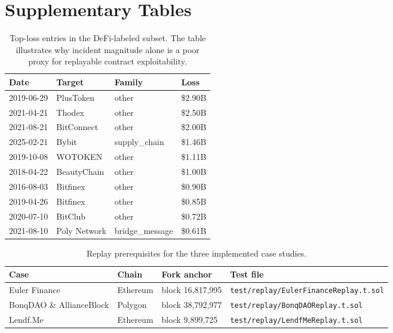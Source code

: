 \appendix
\section{Supplementary Tables}
\label{sec:appendix}

\begin{table}[ht]
\centering
\caption{Top-loss entries in the DeFi-labeled subset. The table illustrates why incident magnitude alone is a poor proxy for replayable contract exploitability.}
\label{tab:top-losses}
\begin{adjustbox}{max width=\textwidth}
\begin{tabular}{llll}
\toprule
\textbf{Date} & \textbf{Target} & \textbf{Family} & \textbf{Loss} \\
\midrule
2019-06-29 & PlusToken & other & \$2.90B \\
2021-04-21 & Thodex & other & \$2.50B \\
2021-08-21 & BitConnect & other & \$2.00B \\
2025-02-21 & Bybit & supply\_chain & \$1.46B \\
2019-10-08 & WOTOKEN & other & \$1.11B \\
2018-04-22 & BeautyChain & other & \$1.00B \\
2016-08-03 & Bitfinex & other & \$0.90B \\
2019-04-26 & Bitfinex & other & \$0.85B \\
2020-07-10 & BitClub & other & \$0.72B \\
2021-08-10 & Poly Network & bridge\_message & \$0.61B \\
\bottomrule
\end{tabular}
\end{adjustbox}
\end{table}

\begin{table}[ht]
\centering
\caption{Replay prerequisites for the three implemented case studies.}
\label{tab:replay-prereqs}
\begin{adjustbox}{max width=\textwidth}
\begin{tabular}{llll}
\toprule
\textbf{Case} & \textbf{Chain} & \textbf{Fork anchor} & \textbf{Test file} \\
\midrule
Euler Finance & Ethereum & block 16{,}817{,}995 & \texttt{test/replay/EulerFinanceReplay.t.sol} \\
BonqDAO \& AllianceBlock & Polygon & block 38{,}792{,}977 & \texttt{test/replay/BonqDAOReplay.t.sol} \\
Lendf.Me & Ethereum & block 9{,}899{,}725 & \texttt{test/replay/LendfMeReplay.t.sol} \\
\bottomrule
\end{tabular}
\end{adjustbox}
\end{table}

